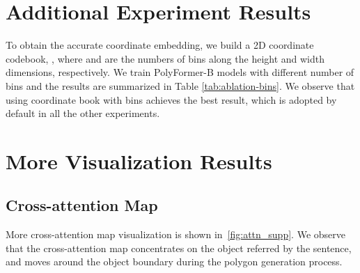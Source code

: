 \section{Additional Experiment Results}
To obtain the accurate coordinate embedding, we build a 2D coordinate codebook, , where  and  are the numbers of bins along the height and width dimensions, respectively. We train PolyFormer-B models with different number of bins  and the results are summarized in Table \ref{tab:ablation-bins}. We observe that using coordinate book with  bins achieves the best result, which is adopted by default in all the other experiments. 


\begin{table}[t]
\centering
{}
\caption{Ablation study on the size of 2D coordinate codebook.}
\label{tab:ablation-bins}
\end{table}



































\section{More Visualization Results}
\subsection{Cross-attention Map} 
More cross-attention map visualization is shown in~\cref{fig:attn_supp}. We observe that the cross-attention map concentrates on the object referred by the sentence, and moves around the object boundary during the polygon generation process. 

